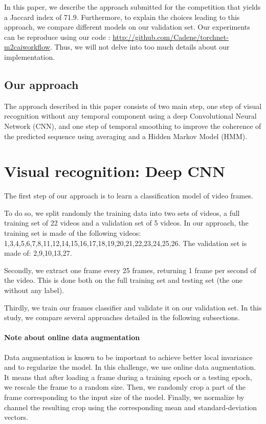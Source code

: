 \documentclass[10pt,twocolumn,letterpaper]{article}
\begin{document}
In this paper, we describe the approach submitted for the competition that yields a Jaccard index of 71.9. Furthermore, to explain the choices leading to this approach, we compare different models on our validation set. Our experiments can be reproduce using our code : \url{http://github.com/Cadene/torchnet-m2caiworkflow}. Thus, we will not delve into too much details about our implementation.

\subsection{Our approach}

The approach described in this paper consists of two main step, one step of visual recognition without any temporal component using a deep Convolutional Neural Network (CNN), and one step of temporal smoothing to improve the coherence of the predicted sequence using averaging and a Hidden Markov Model (HMM).

\section{Visual recognition: Deep CNN}

The first step of our approach is to learn a classification model of video frames.

To do so, we split randomly the training data into two sets of videos, a full training set of 22 videos and a validation set of 5 videos. In our approach, the training set is made of the following videos: 1,3,4,5,6,7,8,11,12,14,15,16,17,18,19,20,21,22,23,24,25,26. The validation set is made of: 2,9,10,13,27.

Secondly, we extract one frame every 25 frames, returning 1 frame per second of the video. This is done both on the full training set and testing set (the one without any label).

Thirdly, we train our frames classifier and validate it on our validation set. In this study, we compare several approaches detailed in the following subsections.

\paragraph{Note about online data augmentation}
Data augmentation is known to be important to achieve better local invariance and to regularize the model.
In this challenge, we use online data augmentation. It means that after loading a frame during a training epoch or a testing epoch, we rescale the frame to a random size. Then, we randomly crop a part of the frame corresponding to the input size of the model. Finally, we normalize by channel the resulting crop using the corresponding mean and standard-deviation vectors. 
\end{document}

